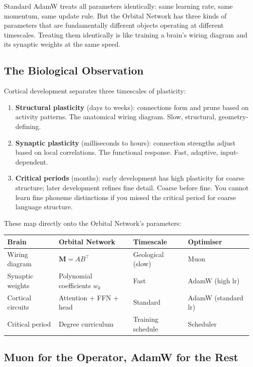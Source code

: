 \documentclass[11pt, a4paper]{article}
\newcommand{\M}{\mathbf{M}}
\theoremstyle{plain}
\theoremstyle{definition}
\theoremstyle{remark}
\begin{document}
Standard AdamW treats all parameters identically: same learning rate, same momentum, same update rule.
But the Orbital Network has three kinds of parameters that are fundamentally different objects operating at different timescales.
Treating them identically is like training a brain's wiring diagram and its synaptic weights at the same speed.

\subsection{The Biological Observation}

Cortical development separates three timescales of plasticity:
\begin{enumerate}[nosep]
\item \textbf{Structural plasticity} (days to weeks): connections form and prune based on activity patterns. The anatomical wiring diagram. Slow, structural, geometry-defining.
\item \textbf{Synaptic plasticity} (milliseconds to hours): connection strengths adjust based on local correlations. The functional response. Fast, adaptive, input-dependent.
\item \textbf{Critical periods} (months): early development has high plasticity for coarse structure; later development refines fine detail. Coarse before fine. You cannot learn fine phoneme distinctions if you missed the critical period for coarse language structure.
\end{enumerate}

These map directly onto the Orbital Network's parameters:
\begin{center}\small
\begin{tabular}{llll}
\toprule
\textbf{Brain} & \textbf{Orbital Network} & \textbf{Timescale} & \textbf{Optimiser} \\
\midrule
Wiring diagram & $\M = AB^\top$ & Geological (slow) & Muon~\cite{jordan2024muon} \\
Synaptic weights & Polynomial coefficients $w_k$ & Fast & AdamW (high lr) \\
Cortical circuits & Attention + FFN + head & Standard & AdamW (standard lr) \\
Critical period & Degree curriculum & Training schedule & Scheduler \\
\bottomrule
\end{tabular}
\end{center}

\subsection{Muon for the Operator, AdamW for the Rest}
\end{document}
